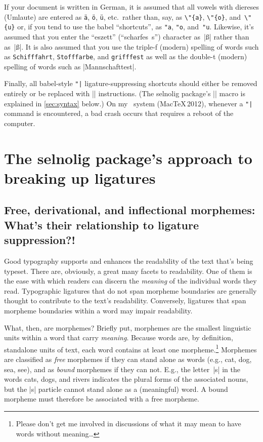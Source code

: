 \documentclass[11pt]{article}
\newcommand{\pkg}[1]{\textsf{#1}}
\begin{document}
If your document is written in German, it is assumed that all vowels with diereses (Umlaute) are entered as \Verb|ä|, \Verb|ö|, \Verb|ü|, etc.\ rather than, say, as \Verb|\"{a}|, \Verb|\"{o}|, and~\Verb|\"{u}| or, if you tend to use the \pkg{babel} \enquote{shortcuts}, as \Verb|"a|, \Verb|"o|, and~\Verb|"u|. Likewise, it's assumed that you enter the \enquote{eszett} (\enquote{scharfes~s}) character as~|ß| rather than as~|\ss|.
It is also assumed that you use the triple-f (modern) spelling of words such as \texttt{Schifffahrt}, \texttt{Stofffarbe}, and \texttt{grifffest} as well as the double-t (modern) spelling of words such as |Mannschafttest|.

Finally, all \pkg{babel}-style \Verb+"|+ ligature-suppressing shortcuts should either be removed entirely or be replaced with |\breaklig| instructions. (The \pkg{selnolig} package's |\breaklig| macro is explained in \cref{sec:syntax} below.) On my \LuaLaTeX\ system (MacTeX\,2012), whenever a \Verb+"|+ command is encountered, a bad crash occurs that requires a reboot of the computer.





\section[The selnolig package's approach to breaking up ligatures]{The \pkg{selnolig} package's approach to breaking up ligatures}

\subsection[Free, derivational, and inflectional morphemes]{Free, derivational, and inflectional morphemes: What's their relationship to ligature suppression?!}


Good typography supports and enhances the readability of the text that's being typeset. There are, obviously, a great many facets to readability. One of them is the ease with which readers can discern the \emph{meaning} of the individual words they read. Typographic ligatures that do not span morpheme boundaries are generally thought to contribute to the text's readability. Conversely, ligatures that span morpheme boundaries within a word may impair readability.

What, then, are morphemes? Briefly put, morphemes are the smallest linguistic units within a word that carry \emph{meaning}. Because words are, by definition, standalone units of text, each word contains at least one morpheme.\footnote{Please don't get me involved in discussions of what it may mean to have words without meaning\dots} Morphemes are classified as \emph{free} morphemes if they can stand alone as words (e.g., cat, dog, sea, see), and as \emph{bound} morphemes if they can not. E.g., the letter~|s| in the words cats, dogs, and rivers indicates the plural forms of the associated nouns, but the |s| particle cannot stand alone as a (meaningful) word. A bound morpheme must therefore be associated with a free morpheme.
\end{document}
